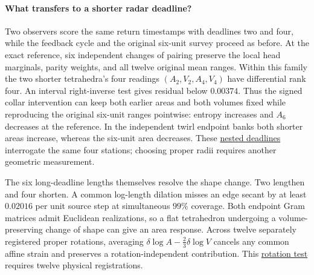 \documentclass[11pt]{article}
\begin{document}
\paragraph{What transfers to a shorter radar deadline?}
Two observers score the same return timestamps with deadlines two and
four, while the feedback cycle and the original six-unit survey proceed
as before. At the exact reference, six independent changes of pairing
preserve the local head marginals, parity weights, and all twelve original
mean ranges. Within this family the two shorter tetrahedra's four
readings $(A_2,V_2,A_4,V_4)$ have differential rank four. An interval
right-inverse test gives residual below $0.00374$. Thus the signed collar
intervention can keep both earlier areas and both volumes fixed while
reproducing the original six-unit ranges pointwise: entropy increases
and $A_6$ decreases at the reference. In the independent twirl endpoint
banks both shorter areas increase, whereas the six-unit area decreases.
These
\href{https://github.com/FloatingPragma/observer-patch-holography/tree/main/code/matched_einstein_limit/source_implication/full_algebra/reuse/retained_equilibrium/nested_ranges}{nested deadlines}
interrogate the same four stations; choosing proper radii requires another
geometric measurement.

The six long-deadline lengths themselves resolve the shape change. Two
lengthen and four shorten. A common log-length dilation misses an edge
secant by at least $0.02016$ per unit source step at simultaneous $99\%$
coverage. Both endpoint Gram matrices admit Euclidean realizations, so a
flat tetrahedron undergoing a volume-preserving change of shape can give
an area response. Across twelve separately registered proper rotations,
averaging $\delta\log A-\tfrac23\delta\log V$ cancels any common affine
strain and preserves a rotation-independent contribution. This
\href{https://github.com/FloatingPragma/observer-patch-holography/tree/main/code/matched_einstein_limit/source_implication/full_algebra/reuse/retained_equilibrium/shape_readout}{rotation test}
requires twelve physical registrations.
\end{document}
